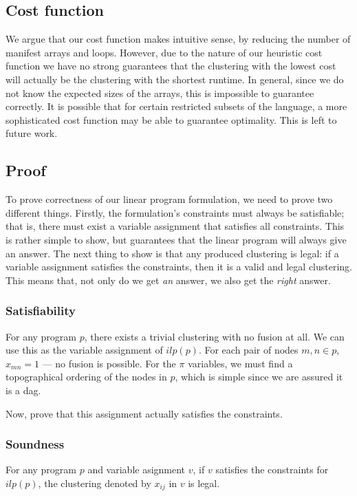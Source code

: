 \subsection{Cost function}
We argue that our cost function makes intuitive sense, by reducing the number of manifest arrays and loops.
However, due to the nature of our heuristic cost function we have no strong guarantees that the clustering with the lowest cost will actually be the clustering with the shortest runtime.
In general, since we do not know the expected sizes of the arrays, this is impossible to guarantee correctly.
It is possible that for certain restricted subsets of the language, a more sophisticated cost function may be able to guarantee optimality.
This is left to future work.

\subsection{Proof}
To prove correctness of our linear program formulation, we need to prove two different things.
Firstly, the formulation's constraints must always be satisfiable; that is, there must exist a variable assignment that satisfies all constraints.
This is rather simple to show, but guarantees that the linear program will always give an answer.
The next thing to show is that any produced clustering is legal: if a variable assignment satisfies the constraints, then it is a valid and legal clustering.
This means that, not only do we get \emph{an} answer, we also get the \emph{right} answer.

\subsubsection{Satisfiability}
For any program $p$, there exists a trivial clustering with no fusion at all.
We can use this as the variable assignment of $ilp(p)$.
For each pair of nodes $m,n \in p$, $x_{mn} = 1$ --- no fusion is possible.
For the $\pi$ variables, we must find a topographical ordering of the nodes in $p$, which is simple since we are assured it is a dag.

Now, prove that this assignment actually satisfies the constraints.


\subsubsection{Soundness}
For any program $p$ and variable asignment $v$, if $v$ satisfies the constraints for $ilp(p)$, the clustering denoted by $x_{ij}$ in $v$ is legal.

